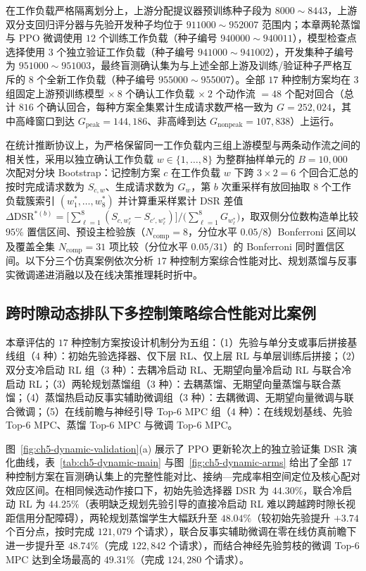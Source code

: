 在工作负载严格隔离划分上，上游分配提议器预训练种子段为 $8000\sim8443$，上游双分支回归评分器与先验开发种子均位于 $911000\sim952007$ 范围内；本章两轮蒸馏与 PPO 微调使用 $12$ 个训练工作负载（种子编号 $940000\sim940011$），模型检查点选择使用 $3$ 个独立验证工作负载（种子编号 $941000\sim941002$），开发集种子编号为 $951000\sim951003$，最终盲测确认集为与上述全部上游及训练/验证种子严格互斥的 $8$ 个全新工作负载（种子编号 $955000\sim955007$）。全部 $17$ 种控制方案均在 $3$ 组固定上游预训练模型 $\times\ 8$ 个确认工作负载 $\times\ 2$ 个动作流 $=48$ 个配对回合（总计 $816$ 个确认回合，每种方案全集累计生成请求数严格一致为 $G=252{,}024$，其中高峰窗口到达 $G_{\mathrm{peak}}=144{,}186$、非高峰到达 $G_{\mathrm{nonpeak}}=107{,}838$）上运行。

在统计推断协议上，为严格保留同一工作负载内三组上游模型与两条动作流之间的相关性，采用以独立确认工作负载 $w\in\{1,\ldots,8\}$ 为整群抽样单元的 $B=10{,}000$ 次配对分块 Bootstrap：记控制方案 $c$ 在工作负载 $w$ 下跨 $3\times 2=6$ 个回合汇总的按时完成请求数为 $S_{c,w}$、生成请求数为 $G_w$，第 $b$ 次重采样有放回抽取 $8$ 个工作负载簇索引 $(w_1^*,\ldots,w_8^*)$ 并计算重采样累计 DSR 差值 $\Delta\mathrm{DSR}^{*(b)}=\big[\sum_{\ell=1}^8(S_{c,w_\ell^*}-S_{c',w_\ell^*})\big]/\big(\sum_{\ell=1}^8 G_{w_\ell^*}\big)$，取双侧分位数构造单比较 $95\%$ 置信区间、预设主检验族（$N_{\mathrm{comp}}=8$，分位水平 $0.05/8$）Bonferroni 区间以及覆盖全集 $N_{\mathrm{comp}}=31$ 项比较（分位水平 $0.05/31$）的 Bonferroni 同时置信区间。以下分三个仿真案例依次分析 $17$ 种控制方案综合性能对比、规划蒸馏与反事实微调递进消融以及在线决策推理耗时折中。

\subsection{跨时隙动态排队下多控制策略综合性能对比案例}

本章评估的 $17$ 种控制方案按设计机制分为五组：（1）先验与单分支或事后拼接基线组（$4$ 种）：初始先验选择器、仅下层 RL、仅上层 RL 与单层训练后拼接；（2）双分支冷启动 RL 组（$3$ 种）：去耦冷启动 RL、无期望向量冷启动 RL 与联合冷启动 RL；（3）两轮规划蒸馏组（$3$ 种）：去耦蒸馏、无期望向量蒸馏与联合蒸馏；（4）蒸馏热启动反事实辅助微调组（$3$ 种）：去耦微调、无期望向量微调与联合微调；（5）在线前瞻与神经引导 Top-6 MPC 组（$4$ 种）：在线规划基线、先验 Top-6 MPC、蒸馏 Top-6 MPC 与微调 Top-6 MPC。

图~\ref{fig:ch5-dynamic-validation}(a) 展示了 PPO 更新轮次上的独立验证集 DSR 演化曲线，表~\ref{tab:ch5-dynamic-main} 与图~\ref{fig:ch5-dynamic-arms} 给出了全部 $17$ 种控制方案在盲测确认集上的完整性能对比、接纳—完成率相空间定位及核心配对效应区间。在相同候选动作接口下，初始先验选择器 DSR 为 $44.30\%$，联合冷启动 RL 为 $44.25\%$（表明缺乏规划先验引导的直接冷启动 RL 难以跨越跨时隙长视距信用分配障碍），两轮规划蒸馏学生大幅跃升至 $48.04\%$（较初始先验提升 $+3.74$ 个百分点，按时完成 $121{,}079$ 个请求），联合反事实辅助微调在零在线仿真前瞻下进一步提升至 $48.74\%$（完成 $122{,}842$ 个请求），而结合神经先验剪枝的微调 Top-6 MPC 达到全场最高的 $49.31\%$（完成 $124{,}280$ 个请求）。

